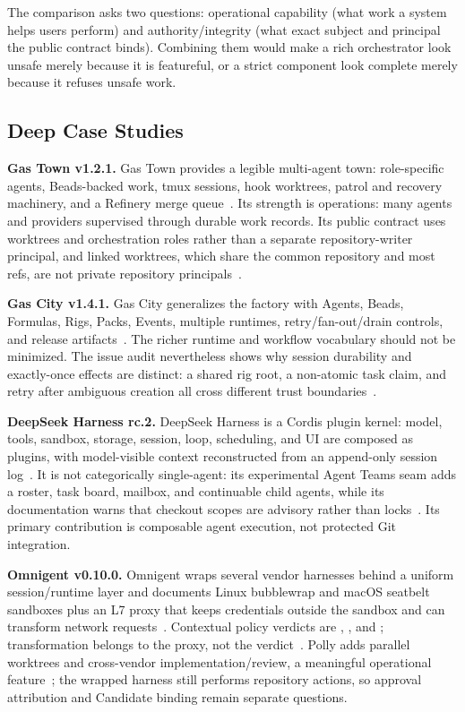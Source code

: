 \documentclass[journal]{IEEEtran}
\newcommand{\code}[1]{\texttt{\detokenize{#1}}}
\begin{document}
The comparison asks two questions: operational capability (what work a system
helps users perform) and authority/integrity (what exact subject and principal
the public contract binds). Combining them would make a rich orchestrator look
unsafe merely because it is featureful, or a strict component look complete
merely because it refuses unsafe work.

\subsection{Deep Case Studies}

\textbf{Gas Town v1.2.1.} Gas Town provides a legible multi-agent town:
role-specific agents, Beads-backed work, tmux sessions, hook worktrees, patrol
and recovery machinery, and a Refinery merge queue~\cite{gastownReadme,gastownV121}.
Its strength is operations: many agents and providers supervised through
durable work records. Its public contract uses worktrees and orchestration
roles rather than a separate repository-writer principal, and linked
worktrees, which share the common repository and most refs, are not private
repository principals~\cite{gitWorktree}.

\textbf{Gas City v1.4.1.} Gas City generalizes the factory with Agents, Beads,
Formulas, Rigs, Packs, Events, multiple runtimes, retry/fan-out/drain controls,
and release artifacts~\cite{gascityReadme,gascityV141}. The richer runtime and
workflow vocabulary should not be minimized. The issue audit nevertheless
shows why session durability and exactly-once effects are distinct: a shared
rig root, a non-atomic task claim, and retry after ambiguous creation all
cross different trust boundaries~\cite{gascity1181,gascity1052,gascity5511}.

\textbf{DeepSeek Harness rc.2.} DeepSeek Harness is a Cordis plugin kernel:
model, tools, sandbox, storage, session, loop, scheduling, and UI are composed
as plugins, with model-visible context reconstructed from an append-only
session log~\cite{dshArch}. It is not categorically single-agent: its
experimental Agent Teams seam adds a roster, task board, mailbox, and
continuable child agents, while its documentation warns that checkout scopes
are advisory rather than locks~\cite{dshTeams}. Its primary contribution is
composable agent execution, not protected Git integration.

\textbf{Omnigent v0.10.0.} Omnigent wraps several vendor harnesses behind a
uniform session/runtime layer and documents Linux bubblewrap and macOS
seatbelt sandboxes plus an L7 proxy that keeps credentials outside the sandbox
and can transform network requests~\cite{omnigentReadme,omnigentProxy}.
Contextual policy verdicts are \code{ALLOW}, \code{DENY}, and \code{ASK};
transformation belongs to the proxy, not the verdict~\cite{omnigentPolicy}.
Polly adds parallel worktrees and cross-vendor implementation/review, a
meaningful operational feature~\cite{omnigentPolly,omnigent1694}; the wrapped
harness still performs repository actions, so approval attribution and
Candidate binding remain separate questions.
\end{document}
